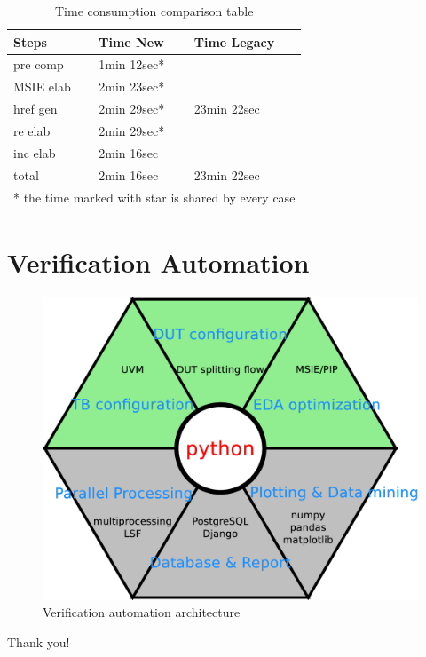 \documentclass{beamer}
\begin{document}
\begin{frame}
  \begin{table}
    \centering
    \begin{tabular}{lll}
      \toprule
      \textbf{Steps} & \textbf{Time New} & \textbf{Time Legacy} \\
      \midrule
      pre comp & 1min 12sec* & \multirow{5}{*}{23min 22sec} \\
      \cline{1-2}
      MSIE elab & 2min 23sec* & \\
      \cline{1-2}
      href gen & 2min 29sec* & \\
      \cline{1-2}
      re elab & 2min 29sec* & \\
      \cline{1-2}
      inc elab & 2min 16sec & \\
      \hline
      total & 2min 16sec & 23min 22sec \\
      \bottomrule
      \multicolumn{3}{l}{\footnotesize{* the time marked with star is shared by every case}}
    \end{tabular}
    \caption{Time consumption comparison table}
  \end{table}
\end{frame}

\section{Verification Automation}

\begin{frame}
  \begin{figure}
    \centering
    \includegraphics[width=0.9\linewidth]{verification_automation}
    \caption{Verification automation architecture}
  \end{figure}
\end{frame}

\begin{frame}
  \Huge{\centerline{Thank you!}}
\end{frame}

\end{document}
